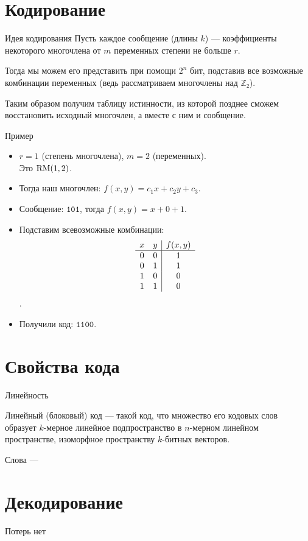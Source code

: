 \section{Кодирование}
\begin{frame}{Идея кодирования}
    Пусть каждое сообщение (длины $k$) — коэффициенты некоторого многочлена от $m$ переменных степени не больше $r$.
    
    Тогда мы можем его представить при помощи $2^n$ бит, подставив все возможные комбинации переменных (ведь рассматриваем многочлены над $ℤ₂$).
    
    Таким образом получим таблицу истинности, из которой позднее сможем восстановить исходный многочлен, а вместе с ним и сообщение.
\end{frame}

\begin{frame}{Пример}
    \begin{itemize}
        \item $r = 1$ (степень многочлена), $m = 2$ (переменных).\\Это $\operatorname{RM}(1, 2)$. \\
        \item Тогда наш многочлен: $f(x, y) = c_1 x + c_2 y + c_3$.
        \item Сообщение: $\mathtt{101}$, тогда $f(x, y) = x + 0 + 1$.
        \item Подставим всевозможные комбинации:
            \[
                \begin{array}{cc | c}
                    x & y & f(x, y) \\\hline
                    0 & 0 & 1 \\
                    0 & 1 & 1 \\
                    1 & 0 & 0 \\
                    1 & 1 & 0
                \end{array}
            \].
        \item Получили код: $\mathtt{1100}$.
    \end{itemize}
\end{frame}

\section{Свойства кода}
\begin{frame}{Линейность}
    \begin{displayquote}
        Линейный (блоковый) код — такой код, что множество его кодовых слов образует $k$-мерное линейное подпространство в $n$-мерном линейном пространстве, изоморфное пространству $k$-битных векторов.
    \end{displayquote}
    Слова — 
\end{frame}

\section{Декодирование}
\begin{frame}{Потерь нет}
    
\end{frame}


